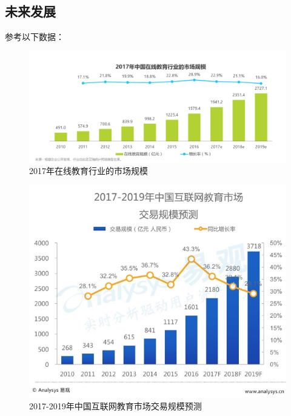 \subsection{未来发展}
参考以下数据：
\begin{figure}[H]
	\centering
	\includegraphics[width=0.9\columnwidth]{figures/2017online_education}
	\caption{2017年在线教育行业的市场规模}
	\label{fg:2017online_education}
\end{figure}

\begin{figure}[H]
	\centering
	\includegraphics[width=0.9\columnwidth]{figures/2017_2019internet_education}
	\caption{2017-2019年中国互联网教育市场交易规模预测}
	\label{fg:2017_2019internet_education}
\end{figure}

